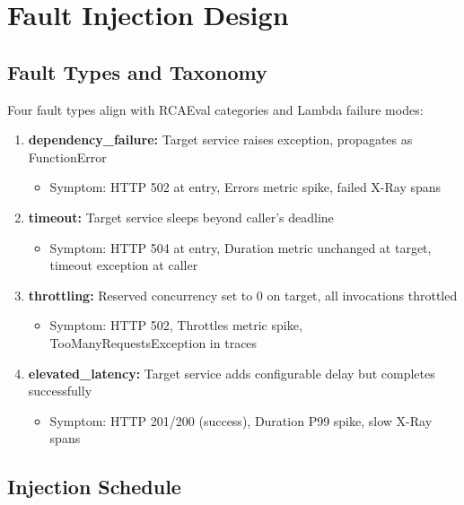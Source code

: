 \section{Fault Injection Design}

\subsection{Fault Types and Taxonomy}

Four fault types align with RCAEval categories and Lambda failure modes:

\begin{enumerate}
    \item \textbf{dependency\_failure:} Target service raises exception, propagates as FunctionError
    \begin{itemize}
        \item Symptom: HTTP 502 at entry, Errors metric spike, failed X-Ray spans
    \end{itemize}
    
    \item \textbf{timeout:} Target service sleeps beyond caller's deadline
    \begin{itemize}
        \item Symptom: HTTP 504 at entry, Duration metric unchanged at target, timeout exception at caller
    \end{itemize}
    
    \item \textbf{throttling:} Reserved concurrency set to 0 on target, all invocations throttled
    \begin{itemize}
        \item Symptom: HTTP 502, Throttles metric spike, TooManyRequestsException in traces
    \end{itemize}
    
    \item \textbf{elevated\_latency:} Target service adds configurable delay but completes successfully
    \begin{itemize}
        \item Symptom: HTTP 201/200 (success), Duration P99 spike, slow X-Ray spans
    \end{itemize}
\end{enumerate}

\subsection{Injection Schedule}

